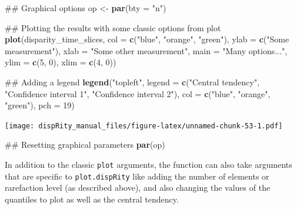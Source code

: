 \documentclass[]{book}
\newenvironment{Shaded}{\begin{snugshade}}{\end{snugshade}}
\newcommand{\KeywordTok}[1]{\textcolor[rgb]{0.13,0.29,0.53}{\textbf{#1}}}
\newcommand{\DataTypeTok}[1]{\textcolor[rgb]{0.13,0.29,0.53}{#1}}
\newcommand{\DecValTok}[1]{\textcolor[rgb]{0.00,0.00,0.81}{#1}}
\newcommand{\StringTok}[1]{\textcolor[rgb]{0.31,0.60,0.02}{#1}}
\newcommand{\NormalTok}[1]{#1}
\theoremstyle{definition}
\theoremstyle{definition}
\theoremstyle{remark}
\begin{document}
\begin{Shaded}
\begin{Highlighting}[]
\NormalTok{## Graphical options}
\NormalTok{op <-}\StringTok{ }\KeywordTok{par}\NormalTok{(}\DataTypeTok{bty =} \StringTok{"n"}\NormalTok{)}

\NormalTok{## Plotting the results with some classic options from plot}
\KeywordTok{plot}\NormalTok{(disparity_time_slices, }\DataTypeTok{col =} \KeywordTok{c}\NormalTok{(}\StringTok{"blue"}\NormalTok{, }\StringTok{"orange"}\NormalTok{, }\StringTok{"green"}\NormalTok{),}
    \DataTypeTok{ylab =} \KeywordTok{c}\NormalTok{(}\StringTok{"Some measurement"}\NormalTok{), }\DataTypeTok{xlab =} \StringTok{"Some other measurement"}\NormalTok{,}
    \DataTypeTok{main =} \StringTok{"Many options..."}\NormalTok{, }\DataTypeTok{ylim =} \KeywordTok{c}\NormalTok{(}\DecValTok{5}\NormalTok{, }\DecValTok{0}\NormalTok{), }\DataTypeTok{xlim =} \KeywordTok{c}\NormalTok{(}\DecValTok{4}\NormalTok{, }\DecValTok{0}\NormalTok{))}

\NormalTok{## Adding a legend}
\KeywordTok{legend}\NormalTok{(}\StringTok{"topleft"}\NormalTok{, }\DataTypeTok{legend =} \KeywordTok{c}\NormalTok{(}\StringTok{"Central tendency"}\NormalTok{,}
                             \StringTok{"Confidence interval 1"}\NormalTok{,}
                            \StringTok{"Confidence interval 2"}\NormalTok{),}
      \DataTypeTok{col =} \KeywordTok{c}\NormalTok{(}\StringTok{"blue"}\NormalTok{, }\StringTok{"orange"}\NormalTok{, }\StringTok{"green"}\NormalTok{), }\DataTypeTok{pch =} \DecValTok{19}\NormalTok{)}
\end{Highlighting}
\end{Shaded}

\texttt{[image: dispRity\_manual\_files/figure-latex/unnamed-chunk-53-1.pdf]}

\begin{Shaded}
\begin{Highlighting}[]
\NormalTok{## Resetting graphical parameters}
\KeywordTok{par}\NormalTok{(op)}
\end{Highlighting}
\end{Shaded}

In addition to the classic \texttt{plot} arguments, the function can
also take arguments that are specific to \texttt{plot.dispRity} like
adding the number of elements or rarefaction level (as described above),
and also changing the values of the quantiles to plot as well as the
central tendency.
\end{document}
